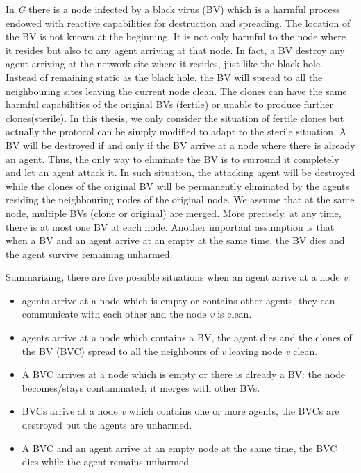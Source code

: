 In {\em G} there is a node infected by a black virus (BV) which is a harmful process endowed with reactive capabilities for destruction and spreading. The location of the BV is not known at the beginning. It is not only harmful to the node where it resides but also to any agent arriving at that node. In fact, a BV destroy any agent arriving at the network site where it resides, just like the black hole. Instead of remaining static as the black hole, the BV will spread to all the neighbouring sites leaving the current node clean. The clones can have the same harmful capabilities of the original BVs (fertile) or unable to produce further clones(sterile). In this thesis, we only consider the situation of fertile clones but actually the protocol can be simply modified to adapt to the sterile situation. A BV will be destroyed if and only if the BV arrive at a node where there is already an agent. Thus, the only way to eliminate the BV is to surround it completely and let an agent attack it. In such situation, the attacking agent will be destroyed while the clones of the original BV will be permanently eliminated by the agents residing the neighbouring nodes of the original node. We assume that at the same node, multiple BVs (clone or original) are merged. More precisely, at any time, there is at most one BV at each node. 
Another important assumption is that when a BV and an agent arrive at an empty at the same time, the BV dies and the agent survive remaining unharmed.

Summarizing, there are five possible situations when an agent arrive at a node {\em v}:
\begin{itemize}
\item agents arrive at a node which is empty or contains other agents, they can communicate with each other and the node {\em v} is clean.
\item agents arrive at a node which contains a BV, the agent dies and the clones of the BV (BVC) spread to all the neighbours of {\em v} leaving node {\em v} clean.
\item A BVC arrives at a node which is empty or there is already a BV: the node becomes/stays contaminated; it merges with other BVs.
\item BVCs arrive at a node {\em v} which contains one or more agents, the BVCs are destroyed but the agents are unharmed.
\item A BVC and an agent arrive at an empty node at the same time, the BVC dies while the agent remains unharmed. 
\end{itemize}

